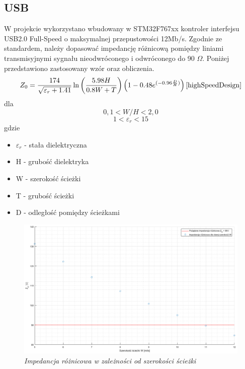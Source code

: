 \documentclass[eng,printmode]{mgr}
\begin{document}
\subsection*{USB}
W projekcie wykorzystano wbudowany w STM32F767xx kontroler interfejsu USB2.0 Full-Speed o maksymalnej przepustowości 12Mb/s. Zgodnie ze standardem, należy dopasować impedancję różnicową pomiędzy liniami transmisyjnymi sygnału nieodwróconego i odwróconego do 90 \textbf{$\Omega$}. Poniżej przedstawiono zastosowany wzór oraz obliczenia.
\begin{equation}
Z_0= \frac{174}{\sqrt{\varepsilon_r + 1.41}}\ln{\left(\frac{5.98H}{0.8W + T}\right)} \left(1-0.48e^{(-0.96\frac{D}{H})}\right) \label{eq:usb_zd} \cite{highSpeedDesign}
\end{equation}
dla 
$$
0,1 < W/H < 2,0
$$
$$
1 < \varepsilon_r < 15
$$
gdzie
\begin{itemize}
  \item \textbf{$\varepsilon_r$} - stała dielektryczna
  \item H - grubość dielektryka
  \item W - szerokość ścieżki
  \item T - grubość ścieżki
  \item D - odległość pomiędzy ścieżkami
\end{itemize}

\begin{figure}[!h]
    \centering
    \includegraphics[width=\textwidth]{plots/usbzD.png}
    \caption{\textit{Impedancja różnicowa w zależności od szerokości ścieżki}}
\end{figure}
\end{document}
